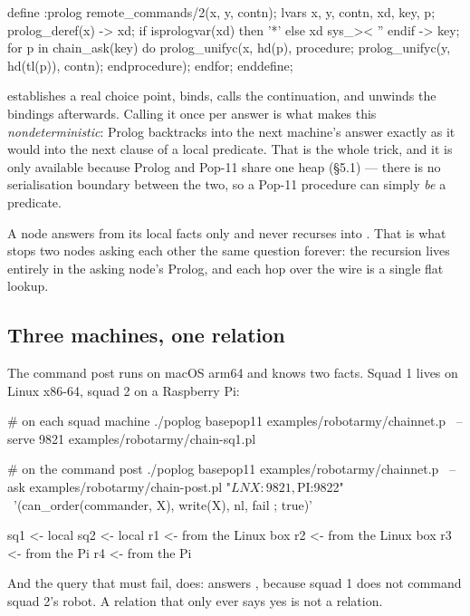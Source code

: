 \begin{pop}
define :prolog remote_commands/2(x, y, contn);
    lvars x, y, contn, xd, key, p;
    prolog_deref(x) -> xd;
    if isprologvar(xd) then '*' else xd sys_>< '' endif -> key;
    for p in chain_ask(key) do
        prolog_unifyc(x, hd(p),
            procedure;
                prolog_unifyc(y, hd(tl(p)), contn);
            endprocedure);
    endfor;
enddefine;
\end{pop}

 establishes a real choice point, binds, calls the
continuation, and unwinds the bindings afterwards. Calling it once per answer
is what makes this \emph{nondeterministic}: Prolog backtracks into the next
machine's answer exactly as it would into the next clause of a local
predicate. That is the whole trick, and it is only available because Prolog
and Pop-11 share one heap (\S5.1) --- there is no serialisation boundary
between the two, so a Pop-11 procedure can simply \emph{be} a predicate.

A node answers from its local facts only and never recurses into
. That is what stops two nodes asking each other the same
question forever: the recursion lives entirely in the asking node's Prolog,
and each hop over the wire is a single flat lookup.

\subsection{Three machines, one relation}

The command post runs on macOS arm64 and knows two facts. Squad 1 lives on
Linux x86-64, squad 2 on a Raspberry Pi:

\begin{sh}
# on each squad machine
./poplog basepop11 examples/robotarmy/chainnet.p \
    --serve 9821 examples/robotarmy/chain-sq1.pl

# on the command post
./poplog basepop11 examples/robotarmy/chainnet.p \
    --ask examples/robotarmy/chain-post.pl "$LNX:9821,$PI:9822" \
    '(can_order(commander, X), write(X), nl, fail ; true)'
\end{sh}

\begin{repl}
sq1        <- local
sq2        <- local
r1         <- from the Linux box
r2         <- from the Linux box
r3         <- from the Pi
r4         <- from the Pi
\end{repl}

\noindent And the query that must fail, does: 
answers , because squad 1 does not command squad 2's robot. A
relation that only ever says yes is not a relation.

